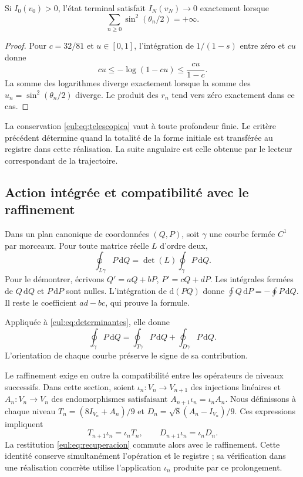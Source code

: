 \begin{proposicion}
Si \(I_0(v_0)>0\), l'état terminal satisfait \(I_N(v_N)\to0\) exactement lorsque
\[
 \sum_{n\ge0}\sin^2(\theta_n/2)=+\infty.
\]
\end{proposicion}
\begin{proof}
Pour \(c=32/81\) et \(u\in[0,1]\), l'intégration de \(1/(1-s)\) entre zéro et \(cu\) donne
\[
 cu\le-\log(1-cu)\le\frac{cu}{1-c}.
\]
La somme des logarithmes diverge exactement lorsque la somme des \(u_n=\sin^2(\theta_n/2)\) diverge. Le produit des \(r_n\) tend vers zéro exactement dans ce cas.
\end{proof}

La conservation \eqref{eul:eq:telescopica} vaut à toute profondeur finie. Le critère précédent détermine quand la totalité de la forme initiale est transférée au registre dans cette réalisation. La suite angulaire est celle obtenue par le lecteur correspondant de la trajectoire.

\subsection{Action intégrée et compatibilité avec le raffinement}
\label{eul:accion-refinamiento}

Dans un plan canonique de coordonnées \((Q,P)\), soit \(\gamma\) une courbe fermée \(C^1\) par morceaux. Pour toute matrice réelle \(L\) d'ordre deux,
\begin{equation}
 \oint_{L\gamma}P\,\mathrm dQ
 =\det(L)\oint_\gamma P\,\mathrm dQ.
\label{eul:eq:accion-determinante}
\end{equation}
Pour le démontrer, écrivons \(Q'=aQ+bP\), \(P'=cQ+dP\). Les intégrales fermées de \(Q\,\mathrm dQ\) et \(P\,\mathrm dP\) sont nulles. L'intégration de \(\mathrm d(PQ)\) donne \(\oint Q\,\mathrm dP=-\oint P\,\mathrm dQ\). Il reste le coefficient \(ad-bc\), qui prouve la formule.

Appliquée à \eqref{eul:eq:determinantes}, elle donne
\[
 \oint_\gamma P\,\mathrm dQ
 =\oint_{T\gamma}P\,\mathrm dQ
  +\oint_{D\gamma}P\,\mathrm dQ.
\]
L'orientation de chaque courbe préserve le signe de sa contribution.

Le raffinement exige en outre la compatibilité entre les opérateurs de niveaux successifs. Dans cette section, soient \(\iota_n:V_n\to V_{n+1}\) des injections linéaires et \(A_n:V_n\to V_n\) des endomorphismes satisfaisant \(A_{n+1}\iota_n=\iota_nA_n\). Nous définissons à chaque niveau \(T_n=(8I_{V_n}+A_n)/9\) et \(D_n=\sqrt8(A_n-I_{V_n})/9\). Ces expressions impliquent
\[
 T_{n+1}\iota_n=\iota_nT_n,
 \qquad D_{n+1}\iota_n=\iota_nD_n.
\]
La restitution \eqref{eul:eq:recuperacion} commute alors avec le raffinement. Cette identité conserve simultanément l'opération et le registre ; sa vérification dans une réalisation concrète utilise l'application \(\iota_n\) produite par ce prolongement.

